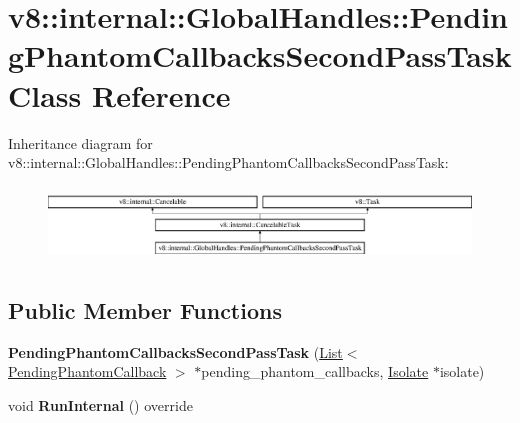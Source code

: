 \hypertarget{classv8_1_1internal_1_1_global_handles_1_1_pending_phantom_callbacks_second_pass_task}{}\section{v8\+:\+:internal\+:\+:Global\+Handles\+:\+:Pending\+Phantom\+Callbacks\+Second\+Pass\+Task Class Reference}
\label{classv8_1_1internal_1_1_global_handles_1_1_pending_phantom_callbacks_second_pass_task}
Inheritance diagram for v8\+:\+:internal\+:\+:Global\+Handles\+:\+:Pending\+Phantom\+Callbacks\+Second\+Pass\+Task\+:\begin{figure}[H]
\begin{center}
\leavevmode
\includegraphics[height=1.995250cm]{classv8_1_1internal_1_1_global_handles_1_1_pending_phantom_callbacks_second_pass_task}
\end{center}
\end{figure}
\subsection*{Public Member Functions}
\begin{DoxyCompactItemize}
\item 
{\bfseries Pending\+Phantom\+Callbacks\+Second\+Pass\+Task} (\hyperlink{classv8_1_1internal_1_1_list}{List}$<$ \hyperlink{classv8_1_1internal_1_1_global_handles_1_1_pending_phantom_callback}{Pending\+Phantom\+Callback} $>$ $\ast$pending\+\_\+phantom\+\_\+callbacks, \hyperlink{classv8_1_1internal_1_1_isolate}{Isolate} $\ast$isolate)\hypertarget{classv8_1_1internal_1_1_global_handles_1_1_pending_phantom_callbacks_second_pass_task_a33955ac5ff317477f5aac155736e2829}{}\label{classv8_1_1internal_1_1_global_handles_1_1_pending_phantom_callbacks_second_pass_task_a33955ac5ff317477f5aac155736e2829}

\item 
void {\bfseries Run\+Internal} () override\hypertarget{classv8_1_1internal_1_1_global_handles_1_1_pending_phantom_callbacks_second_pass_task_a80e6e2d5a738ec39203428f142ec82cb}{}\label{classv8_1_1internal_1_1_global_handles_1_1_pending_phantom_callbacks_second_pass_task_a80e6e2d5a738ec39203428f142ec82cb}

\end{DoxyCompactItemize}
